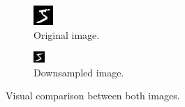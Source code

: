 \begin{figure}
  \begin{subfigure}{0.49\textwidth}
    \centering
    \includegraphics[width = \textwidth]{figures/reshaped.jpg}
    \caption{Original image.}
  \end{subfigure}
  \begin{subfigure}{0.49\textwidth}
    \centering
    \includegraphics[width = \textwidth]{figures/resized.jpg}
    \caption{Downsampled image.}
  \end{subfigure}
  \caption{Visual comparison between both images.}\label{fig:mnist_resized}
\end{figure} \

